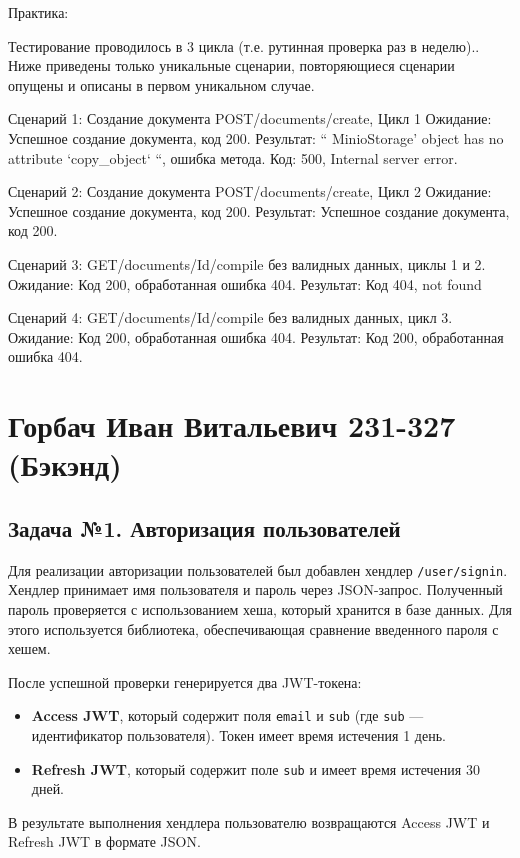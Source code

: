 \documentclass[a4paper,12pt]{article}
\begin{document}
Практика:

Тестирование проводилось в 3 цикла (т.е. рутинная проверка раз в неделю).. Ниже приведены только уникальные сценарии, повторяющиеся сценарии опущены и описаны в первом уникальном случае.

Сценарий 1: Создание документа POST/documents/create, Цикл 1
Ожидание: Успешное создание документа, код 200.
Результат: “ MinioStorage’ object has no attribute ‘copy\_object‘ “, ошибка метода. Код: 500, Internal server error.

Сценарий 2: Создание документа POST/documents/create, Цикл 2
Ожидание: Успешное создание документа, код 200.
Результат: Успешное создание документа, код 200.

Сценарий 3: GET/documents/{Id}/compile без валидных данных, циклы 1 и 2.
Ожидание: Код 200, обработанная ошибка 404.
Результат: Код 404, not found

Сценарий 4: GET/documents/{Id}/compile без валидных данных, цикл 3.
Ожидание: Код 200, обработанная ошибка 404.
Результат: Код 200, обработанная ошибка 404.


\newpage
\section*{Горбач Иван Витальевич 231-327 (Бэкэнд)}

\subsection*{Задача №1. Авторизация пользователей}
Для реализации авторизации пользователей был добавлен хендлер \texttt{/user/signin}. Хендлер принимает имя пользователя и пароль через JSON-запрос. Полученный пароль проверяется с использованием хеша, который хранится в базе данных. Для этого используется библиотека, обеспечивающая сравнение введенного пароля с хешем.

После успешной проверки генерируется два JWT-токена:
\begin{itemize}
    \item \textbf{Access JWT}, который содержит поля \texttt{email} и \texttt{sub} (где \texttt{sub} — идентификатор пользователя). Токен имеет время истечения 1 день.
    \item \textbf{Refresh JWT}, который содержит поле \texttt{sub} и имеет время истечения 30 дней.
\end{itemize}

В результате выполнения хендлера пользователю возвращаются Access JWT и Refresh JWT в формате JSON.
\end{document}
